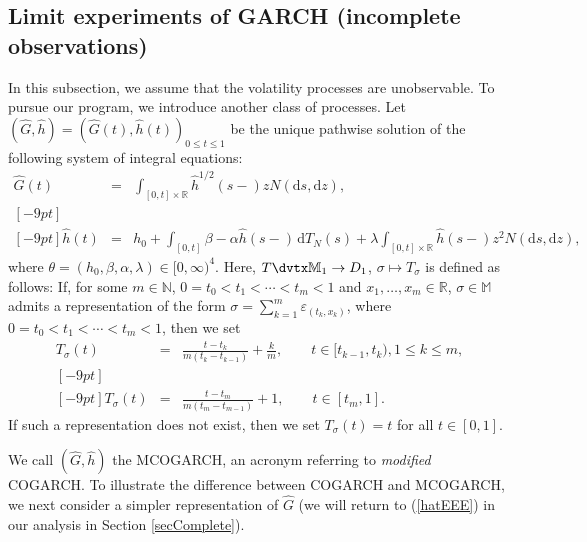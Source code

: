\documentclass[number,citesort,seceqn,dvips]{arxbj}
\newcommand{\eqref}[1]{(\ref{#1})}
\newcommand{\RR}{\mathbb{R}}
\newcommand{\NN}{\mathbb{N}}
\newcommand{\MM}{\mathbb{M}}
\begin{document}
\subsection{Limit experiments of GARCH (incomplete
observations)}\label{secIncomplete}\vspace*{-3pt}
 In this subsection, we assume that the
vola\-tility processes are unobservable. To pursue our program, we
introduce another class of processes. Let $(\widehat G, \hat
h)=(\widehat G(t), \hat h(t))_{0\le t\le1}$ be the unique pathwise
solution of the following system of integral equations:
%
\begin{eqnarray}\label{hatEEE}
\widehat G(t)&=&\int_{[0,t]\times\RR}
\hat h^{1/2}(s-)z N(\mathrm{d}s,\mathrm{d}z) ,\nonumber\\ [-9pt]\\ [-9pt]
\hat h(t)&=&h_0+\int_{[0,t]} \beta - \alpha\hat
h(s-)\,\mathrm{d}T_{N} (s)+\lambda\int_{[0,t]\times\RR}  \hat
h(s-)z^2
N(\mathrm{d}s,\mathrm{d}z) ,\nonumber
\end{eqnarray}
%
where $\theta=(h_0,\beta,\alpha,\lambda)\in[0,\infty)^4$. Here,
$T\dvtx\MM_1\to D_1$, $\sigma\mapsto T_\sigma$ is defined as follows: If,
for some $m\in\NN$, $0=t_0<t_1<\cdots<t_{m}< 1$ and $x_1,\dots,x_m\in
\RR$,
$\sigma\in\MM$ admits a representation of the form
$\sigma=\sum_{k=1}^m\varepsilon_{(t_k,x_k)}$, where
$0=t_0<t_1<\cdots<t_{m}< 1$, then we set
%
\begin{eqnarray}\label{timechange}
T_{\sigma}(t)&=&
\frac{t - t_k}{m(t_k - t_{k - 1})}+\frac km ,\qquad  t\in
[t_{k-1},t_k),  1\le k\le m ,\nonumber\\ [-9pt]\\ [-9pt]
T_{\sigma}(t)&=&\frac{t - t_m}{m(t_m - t_{m - 1})}+1,\qquad
t\in[t_{m},1].\nonumber
\end{eqnarray}
%
If such a representation does not exist, then we set $T_{\sigma}(t)=t$
for all $t\in[0,1]$.

We call $(\widehat G,\hat h)$ the MCOGARCH, an acronym referring to
\textit{modified} COGARCH. To illustrate the difference between COGARCH
and MCOGARCH, we next consider a simpler representation of $\widehat G$
(we will return to \eqref{hatEEE} in our analysis in
Section \ref{secComplete}).
\end{document}
